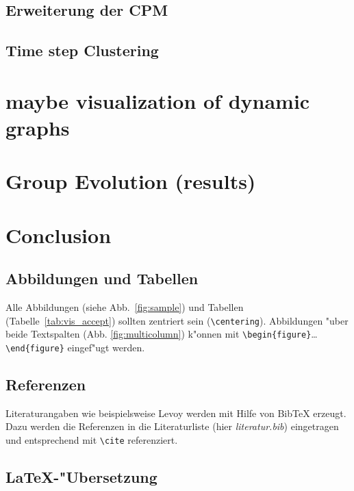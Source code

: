 \documentclass[journal]{vgtc}
\begin{document}
  \subsection{Erweiterung der CPM}
  \subsection{Time step Clustering}

\section{maybe visualization of dynamic graphs}
  
\section{Group Evolution (results)}
 
\section{Conclusion}


\subsection{Abbildungen und Tabellen}

Alle Abbildungen (siehe Abb.\ \ref{fig:sample}) und Tabellen (Tabelle\
\ref{tab:vis_accept}) sollten zentriert sein
(\verb|\centering|). Abbildungen "uber beide Textspalten
(Abb. \ref{fig:multicolumn}) k"onnen mit
\verb|\begin{figure}|\ldots\verb|\end{figure}| eingef"ugt werden.

\subsection{Referenzen}

Literaturangaben wie beispielsweise Levoy \cite{levoy:1989:DSV} werden
mit Hilfe von BibTeX erzeugt. Dazu werden die Referenzen in die
Literaturliste (hier \emph{literatur.bib}) eingetragen und
entsprechend mit \verb|\cite| referenziert.

\subsection{\LaTeX-"Ubersetzung}
\end{document}
